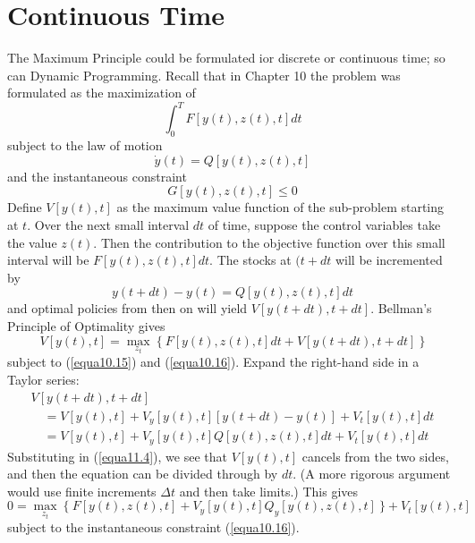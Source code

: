 \section*{Continuous Time}

The Maximum Principle could be formulated ior discrete or continuous time; so can Dynamic Programming. Recall that in Chapter 10 the problem was formulated as the maximization of
\begin{equation*} \tag{10.17}
\int_{0}^{T} F[y(t), z(t), t] dt
\end{equation*}
subject to the law of motion
\begin{equation*} \tag{10.15}
 \dot{y}(t) = Q[y(t), z(t), t] 
\end{equation*}
and the instantaneous constraint
\begin{equation*} \tag{10.16}
G[y(t), z(t), t]  \leq 0
\end{equation*}
Define $V[y(t), t]$ as the maximum value function of the sub-problem starting at $t$. Over the next small interval $dt$ of time, suppose the control variables take the value $z(t)$. Then the contribution to the objective function over this small interval will be $F[y(t), z(t),t] dt$. The stocks at $(t + dt$ will be incremented by
\begin{equation*}
y(t+dt) -y(t) = Q[y(t), z(t), t]dt
\end{equation*}
and optimal policies from then on will yield $V[y(t+dt), t+dt]$. Bellman's Principle of Optimality gives
\begin{equation} \label{equa11.4}
 V[y(t), t] = \mathop{\max}\limits_{z_t} \ \{ \ F[y(t), z(t), t] dt + V[y(t+dt), t+dt] \ \}
\end{equation}
subject to (\ref{equa10.15}) and (\ref{equa10.16}). Expand the right-hand side in a Taylor series:
\begin{equation*}
\begin{array}{l}
V[y(t+dt), t+dt] \\
\quad = V[y(t),t] + V_y[y(t),t][y(t+dt) - y(t)] + V_t[y(t),t] dt \\
\quad = V[y(t),t] + V_y[y(t),t] Q[y(t), z(t),t]dt + V_t[y(t),t]dt
\end{array}
\end{equation*}
Substituting in (\ref{equa11.4}), we see that $V[y(t), t]$ cancels from the two sides, and then the equation can be divided through by $dt$. (A more rigorous argument would use finite increments $\Delta t$ and then take limits.) This gives
\begin{equation} \label{equa11.5}
 0= \mathop{\max}\limits_{z_t} \ \{ \ F[y(t),z(t),t] + V_y[y(t),t] Q_y[y(t), z(t),t]  \ \} + V_t[y(t),t]
\end{equation}
subject to the instantaneous constraint (\ref{equa10.16}).

